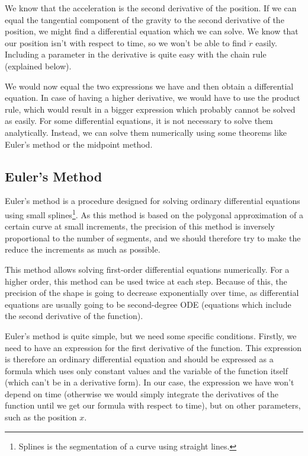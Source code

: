 \documentclass[12pt,twoside,a4paper]{article}
\begin{document}
	We know that the acceleration is the second derivative of the position. If we can equal the tangential component of the gravity to the second derivative of the position, we might find a differential equation which we can solve. We know that our position isn't with respect to time, so we won't be able to find $\ddot{r}$ easily. Including a parameter in the derivative is quite easy with the chain rule (explained below).
	
	We would now equal the two expressions we have and then obtain a differential equation. In case of having a higher derivative, we would have to use the product rule, which would result in a bigger expression which probably cannot be solved as easily. For some differential equations, it is not necessary to solve them analytically. Instead, we can solve them numerically using some theorems like Euler's method or the midpoint method.
	
	\newpage
	
	\subsection{Euler's Method}
	Euler's method is a procedure designed for solving ordinary differential equations using small splines\footnote{Splines is the segmentation of a curve using straight lines.}. As this method is based on the polygonal approximation of a certain curve at small increments, the precision of this method is inversely proportional to the number of segments, and we should therefore try to make the reduce the increments as much as possible.
	
	This method allows solving first-order differential equations numerically. For a higher order, this method can be used twice at each step. Because of this, the precision of the shape is going to decrease exponentially over time, as differential equations are usually going to be second-degree ODE (equations which include the second derivative of the function).
	
	Euler's method is quite simple, but we need some specific conditions. Firstly, we need to have an expression for the first derivative of the function. This expression is therefore an ordinary differential equation and should be expressed as a formula which uses only constant values and the variable of the function itself (which can't be in a derivative form). In our case, the expression we have won't depend on time (otherwise we would simply integrate the derivatives of the function until we get our formula with respect to time), but on other parameters, such as the position $x$.
	
\end{document}

